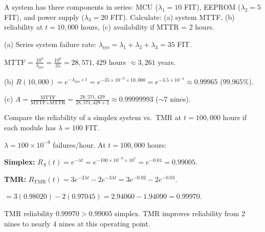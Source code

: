 \begin{example}
A system has three components in series: MCU ($\lambda_1 = 10$ FIT), EEPROM ($\lambda_2 = 5$ FIT), and power supply ($\lambda_3 = 20$ FIT). Calculate: (a) system MTTF, (b) reliability at $t = 10{,}000$ hours, (c) availability if MTTR = 2 hours.

\begin{solution}
(a) Series system failure rate: $\lambda_{\text{sys}} = \lambda_1 + \lambda_2 + \lambda_3 = 35$ FIT.

$\text{MTTF} = \frac{10^9}{\lambda_{\text{sys}}} = \frac{10^9}{35} = 28{,}571{,}429$ hours $\approx 3{,}261$ years.

(b) $R(10{,}000) = e^{-\lambda_{\text{sys}} \times t} = e^{-35 \times 10^{-9} \times 10{,}000} = e^{-3.5 \times 10^{-4}} \approx 0.99965$ ($99.965\%$).

(c) $A = \frac{\text{MTTF}}{\text{MTTF} + \text{MTTR}} = \frac{28{,}571{,}429}{28{,}571{,}429 + 2} \approx 0.99999993$ ($\sim$7 nines).
\end{solution}
\end{example}

\begin{example}
Compare the reliability of a simplex system vs.\ TMR at $t = 100{,}000$ hours if each module has $\lambda = 100$ FIT.

\begin{solution}
$\lambda = 100 \times 10^{-9}$ failures/hour. At $t = 100{,}000$ hours:

\textbf{Simplex:} $R_S(t) = e^{-\lambda t} = e^{-100 \times 10^{-9} \times 10^5} = e^{-0.01} = 0.99005$.

\textbf{TMR:} $R_{\text{TMR}}(t) = 3e^{-2\lambda t} - 2e^{-3\lambda t} = 3e^{-0.02} - 2e^{-0.03}$.

$= 3(0.98020) - 2(0.97045) = 2.94060 - 1.94090 = 0.99970$.

TMR reliability $0.99970 > 0.99005$ simplex. TMR improves reliability from 2 nines to nearly 4 nines at this operating point.
\end{solution}
\end{example}

